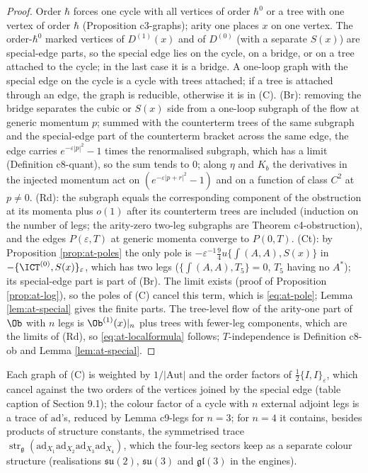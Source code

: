 \begin{proof}
Order $\hbar$ forces one cycle with all vertices of order $\hbar^0$ or a tree with one vertex of order $\hbar$ (Proposition c3-graphs); arity one places $x$ on one vertex. The order-$\hbar^0$ marked vertices of $D^{(1)}(x)$ and of $D^{(0)}$ (with a separate $S(x)$) are special-edge parts, so the special edge lies on the cycle, on a bridge, or on a tree attached to the cycle; in the last case it is a bridge. A one-loop graph with the special edge on the cycle is a cycle with trees attached; if a tree is attached through an edge, the graph is reducible, otherwise it is in (C). (Br): removing the bridge separates the cubic or $S(x)$ side from a one-loop subgraph of the flow at generic momentum $p$; summed with the counterterm trees of the same subgraph and the special-edge part of the counterterm bracket across the same edge, the edge carries $e^{-\varepsilon|p|^2}-1$ times the renormalised subgraph, which has a limit (Definition c8-quant), so the sum tends to $0$; along $\eta$ and $K_b$ the derivatives in the injected momentum act on $(e^{-\varepsilon|p+r|^2}-1)$ and on a function of class $C^2$ at $p\ne0$. (Rd): the subgraph equals the corresponding component of the obstruction at its momenta plus $o(1)$ after its counterterm trees are included (induction on the number of legs; the arity-zero two-leg subgraphs are Theorem c4-obstruction), and the edges $P(\varepsilon,T)$ at generic momenta converge to $P(0,T)$. (Ct): by Proposition \ref{prop:at-poles} the only pole is $-\varepsilon^{-1}\tfrac94u\{\int(A,A),S(x)\}$ in $-\{\ICT^{(0)},S(x)\}_\varepsilon$, which has two legs ($\{\int(A,A),T_5\}=0$, $T_5$ having no $A^*$); its special-edge part is part of (Br). The limit exists (proof of Proposition \ref{prop:at-log}), so the poles of (C) cancel this term, which is \eqref{eq:at-pole}; Lemma \ref{lem:at-special} gives the finite parts. The tree-level flow of the arity-one part of $\Ob$ with $n$ legs is $\Ob^{(1)}(x)|_n$ plus trees with fewer-leg components, which are the limits of (Rd), so \eqref{eq:at-localformula} follows; $T$-independence is Definition c8-ob and Lemma \ref{lem:at-special}.
\end{proof}

\begin{remark}[Counting]
\label{rem:at-counting}
Each graph of (C) is weighted by $1/|\mathrm{Aut}|$ and the order factors of $\tfrac12\{I,I\}_\varepsilon$, which cancel against the two orders of the vertices joined by the special edge (table caption of Section 9.1); the colour factor of a cycle with $n$ external adjoint legs is a trace of $\mathrm{ad}$'s, reduced by Lemma c9-legs for $n=3$; for $n=4$ it contains, besides products of structure constants, the symmetrised trace $\operatorname{str}_{\mathfrak g}(\mathrm{ad}_{X_1}\mathrm{ad}_{X_2}\mathrm{ad}_{X_3}\mathrm{ad}_{X_4})$, which the four-leg sectors keep as a separate colour structure (realisations $\mathfrak{su}(2)$, $\mathfrak{su}(3)$ and $\mathfrak{gl}(3)$ in the engines).
\end{remark}

